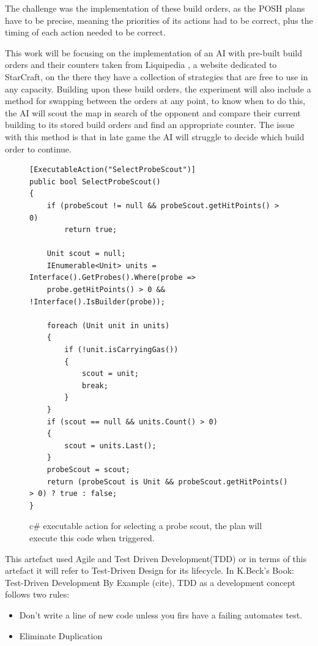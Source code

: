 \documentclass[journal]{IEEEtran}
\begin{document}
The challenge was the implementation of these build orders, as the POSH plans have to be precise, meaning the priorities of its actions had to be correct, plus the timing of each action needed to be correct. 

This work will be focusing on the implementation of an AI with pre-built build orders and their counters taken from Liquipedia \cite{Liquid}, a website dedicated to StarCraft, on the there they have a collection of strategies that are free to use in any capacity. Building upon these build orders, the experiment will also include a method for swapping between the orders at any point, to know when to do this, the AI will scout the map in search of the opponent and compare their current building to its stored build orders and find an appropriate counter. The issue with this method is that in late game the AI will struggle to decide which build order to continue. 

\begin{figure}[H]
	\begin{lstlisting}
[ExecutableAction("SelectProbeScout")]
public bool SelectProbeScout()
{
    if (probeScout != null && probeScout.getHitPoints() > 0)
        return true;

    Unit scout = null;
    IEnumerable<Unit> units = Interface().GetProbes().Where(probe =>
    probe.getHitPoints() > 0 && !Interface().IsBuilder(probe));

    foreach (Unit unit in units)
    {
        if (!unit.isCarryingGas())
        {
            scout = unit;
            break;
        }
    }
    if (scout == null && units.Count() > 0)
    {
        scout = units.Last();
    }
    probeScout = scout;
    return (probeScout is Unit && probeScout.getHitPoints() > 0) ? true : false;
}
	\end{lstlisting}
	\caption{c\# executable action for selecting a probe scout, the plan will execute this code when triggered.}
	\label{Fig3}
\end{figure}

This artefact used Agile and Test Driven Development(TDD) or in terms of this artefact it will refer to Test-Driven Design for its lifecycle. In K.Beck's Book: Test-Driven Development By Example (cite), TDD as a development concept follows two rules:

\begin{itemize}
	\item Don't write a line of new code unless you firs have a failing automates test.
	\item Eliminate Duplication
\end{itemize}
\end{document}
